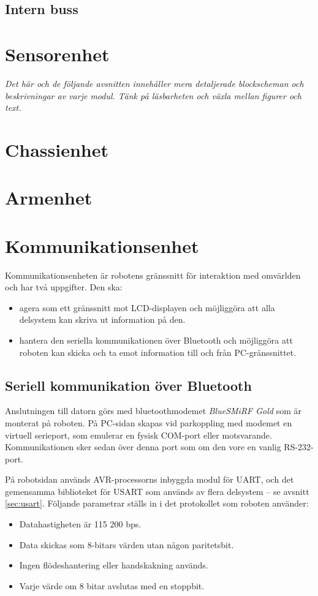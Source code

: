 \documentclass[a4paper,12pt]{article}
\begin{document}
\subsection{Intern buss}
\label{sec:bus}

\section{Sensorenhet}
\emph{Det här och de följande avsnitten innehåller mera detaljerade blockscheman och beskrivningar av varje modul.
Tänk på läsbarheten och växla mellan figurer och text.}
\section{Chassienhet}

\section{Armenhet}

\section{Kommunikationsenhet}
Kommunikationsenheten är robotens gränssnitt för interaktion med omvärlden och har två uppgifter. Den ska:
\begin{itemize}
\item agera som ett gränssnitt mot LCD-displayen och möjliggöra att alla delsystem kan skriva ut information på den.
\item hantera den seriella kommunikationen över Bluetooth och möjliggöra att roboten kan skicka och ta emot information till och från PC-gränssnittet.
\end{itemize}

\subsection{Seriell kommunikation över Bluetooth}
Anslutningen till datorn görs med bluetoothmodemet \emph{BlueSMiRF Gold} som är monterat på roboten. På PC-sidan skapas vid parkoppling med modemet en virtuell serieport, som emulerar en fysisk COM-port eller motsvarande. Kommunikationen sker sedan över denna port som om den vore en vanlig RS-232-port. 

På robotsidan används AVR-processorns inbyggda modul för UART, och det gemensamma biblioteket för USART som används av flera delsystem -- se avsnitt \ref{sec:usart}. Följande parametrar ställs in i det protokollet som roboten använder:
\begin{itemize}
\item Datahastigheten är 115 200 bps.
\item Data skickas som 8-bitars värden utan någon paritetsbit.
\item Ingen flödeshantering eller handskakning används.
\item Varje värde om 8 bitar avslutas med en stoppbit.
\end{itemize}
\end{document}
